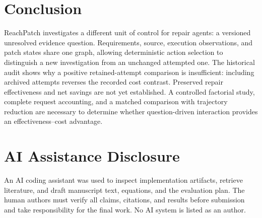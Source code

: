 \documentclass[acmsmall,screen,review,anonymous]{acmart}
\newcommand{\system}{ReachPatch}
\begin{document}
\section{Conclusion}
\system{} investigates a different unit of control for repair agents: a versioned unresolved evidence question. Requirements, source, execution observations, and patch states share one graph, allowing deterministic action selection to distinguish a new investigation from an unchanged attempted one. The historical audit shows why a positive retained-attempt comparison is insufficient: including archived attempts reverses the recorded cost contrast. Preserved repair effectiveness and net savings are not yet established. A controlled factorial study, complete request accounting, and a matched comparison with trajectory reduction are necessary to determine whether question-driven interaction provides an effectiveness--cost advantage.

\section*{AI Assistance Disclosure}
An AI coding assistant was used to inspect implementation artifacts, retrieve literature, and draft manuscript text, equations, and the evaluation plan. The human authors must verify all claims, citations, and results before submission and take responsibility for the final work. No AI system is listed as an author.



\end{document}
